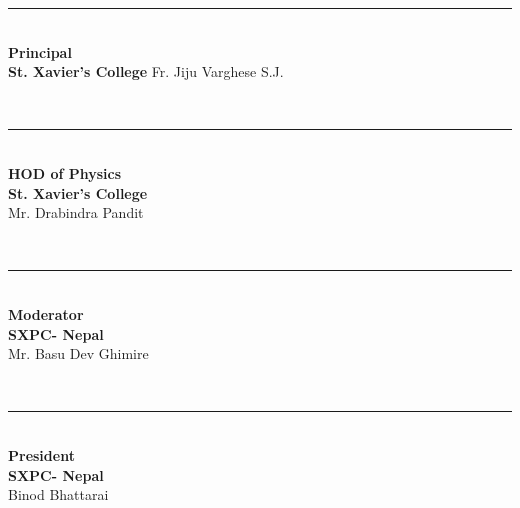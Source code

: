 \documentclass[a4paper,10pt]{article} %
\begin{document}
\vspace{2.8cm}

\begin{center}

\begin{minipage}{0.2\textwidth} %
\begin{flushleft} %
\rule{3.3cm}{0.4pt} \\[0.5cm] %
\textbf{Principal}\\
\textbf{St. Xavier's College}
Fr. Jiju Varghese S.J.
\end{flushleft}
\end{minipage}
~
\begin{minipage}{0.2\textwidth}
\begin{flushleft}
\rule{3.3cm}{0.4pt} \\[0.5cm]
\textbf{HOD of Physics}\\
\textbf{St. Xavier's College}\\
Mr. Drabindra Pandit
\end{flushleft}
\end{minipage}
~
\begin{minipage}{0.21\textwidth}
\begin{flushleft}
\rule{3.4cm}{0.4pt} \\[0.5cm]
\textbf{Moderator}\\
\textbf{SXPC- Nepal}\\
Mr. Basu Dev Ghimire
\end{flushleft}
\end{minipage}
~
\begin{minipage}{0.2\textwidth}
\begin{flushleft}
\rule{3cm}{0.4pt} \\[0.5cm]
\textbf{President}\\
\textbf{SXPC- Nepal}\\
Binod Bhattarai
\end{flushleft}
\end{minipage}

\end{center}
\end{document}

